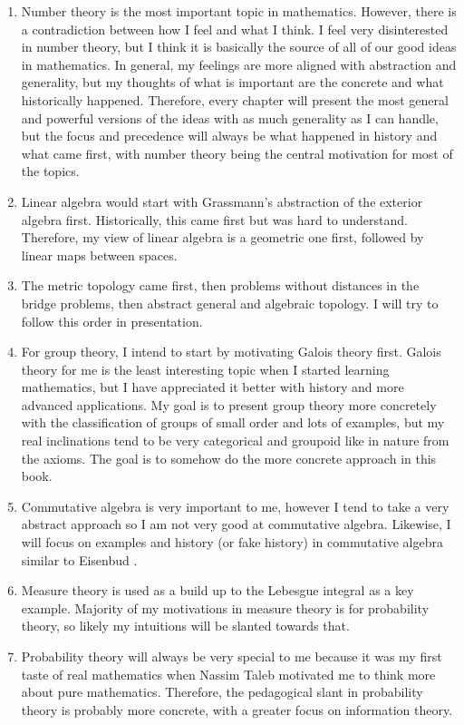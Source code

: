\documentclass{tufte-book}
\begin{document}
\begin{enumerate}
  \item Number theory is the most important topic in mathematics. However, there is a contradiction between how I feel and what I think. I feel very disinterested in number theory, but I think it is basically the source of all of our good ideas in mathematics. In general, my feelings are more aligned with abstraction and generality, but my thoughts of what is important are the concrete and what historically happened. Therefore, every chapter will present the most general and powerful versions of the ideas with as much generality as I can handle, but the focus and precedence will always be what happened in history and what came first, with number theory being the central motivation for most of the topics.
  \item Linear algebra would start with Grassmann's abstraction of the exterior algebra first. Historically, this came first but was hard to understand. Therefore, my view of linear algebra is a geometric one first, followed by linear maps between spaces.
  \item The metric topology came first, then problems without distances in the bridge problems, then abstract general and algebraic topology. I will try to follow this order in presentation.
  \item For group theory, I intend to start by motivating Galois theory first. Galois theory for me is the least interesting topic when I started learning mathematics, but I have appreciated it better with history and more advanced applications. My goal is to present group theory more concretely with the classification of groups of small order and lots of examples, but my real inclinations tend to be very categorical and groupoid like in nature from the axioms. The goal is to somehow do the more concrete approach in this book.
  \item Commutative algebra is very important to me, however I tend to take a very abstract approach so I am not very good at commutative algebra. Likewise, I will focus on examples and history (or fake history) in commutative algebra similar to Eisenbud \cite{Eisenbud2004}.
  \item Measure theory is used as a build up to the Lebesgue integral as a key example. Majority of my motivations in measure theory is for probability theory, so likely my intuitions will be slanted towards that.
  \item Probability theory will always be very special to me because it was my first taste of real mathematics when Nassim Taleb motivated me to think more about pure mathematics. Therefore, the pedagogical slant in probability theory is probably more concrete, with a greater focus on information theory.

\end{enumerate}
\end{document}
